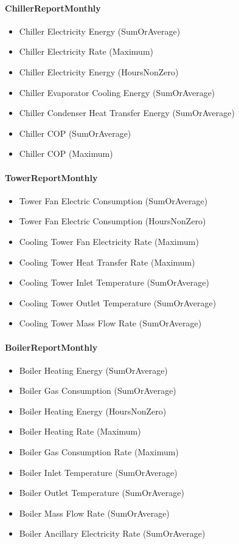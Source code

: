 \paragraph{ChillerReportMonthly}\label{chillerreportmonthly}

\begin{itemize}
\item
  Chiller Electricity Energy (SumOrAverage)
\item
  Chiller Electricity Rate (Maximum)
\item
  Chiller Electricity Energy (HoursNonZero)
\item
  Chiller Evaporator Cooling Energy (SumOrAverage)
\item
  Chiller Condenser Heat Transfer Energy (SumOrAverage)
\item
  Chiller COP (SumOrAverage)
\item
  Chiller COP (Maximum)
\end{itemize}

\paragraph{TowerReportMonthly}\label{towerreportmonthly}

\begin{itemize}
\item
  Tower Fan Electric Consumption (SumOrAverage)
\item
  Tower Fan Electric Consumption (HoursNonZero)
\item
  Cooling Tower Fan Electricity Rate (Maximum)
\item
  Cooling Tower Heat Transfer Rate (Maximum)
\item
  Cooling Tower Inlet Temperature (SumOrAverage)
\item
  Cooling Tower Outlet Temperature (SumOrAverage)
\item
  Cooling Tower Mass Flow Rate (SumOrAverage)
\end{itemize}

\paragraph{BoilerReportMonthly}\label{boilerreportmonthly}

\begin{itemize}
\item
  Boiler Heating Energy (SumOrAverage)
\item
  Boiler Gas Consumption (SumOrAverage)
\item
  Boiler Heating Energy (HoursNonZero)
\item
  Boiler Heating Rate (Maximum)
\item
  Boiler Gas Consumption Rate (Maximum)
\item
  Boiler Inlet Temperature (SumOrAverage)
\item
  Boiler Outlet Temperature (SumOrAverage)
\item
  Boiler Mass Flow Rate (SumOrAverage)
\item
  Boiler Ancillary Electricity Rate (SumOrAverage)
\end{itemize}

